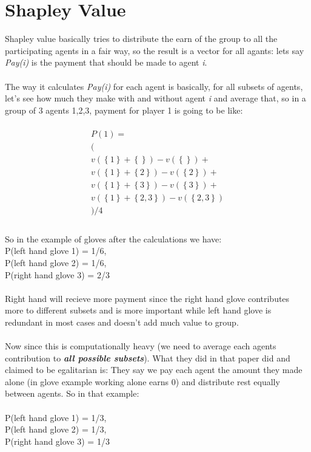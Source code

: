 \documentclass{article}
\begin{document}
  
\section{Shapley Value}
  
Shapley value basically tries to distribute the earn of the group to all the participating agents in a fair way, so the result is a vector for all agants: lets say \emph{Pay(i)} is the payment that should be made to agent \emph{i}.
\\
\\
The way it calculates \emph{Pay(i)} for each agent is basically, for all subsets of agents, let's see how much they make with and without agent \emph{i} and average that, so in a group of 3 agents {1,2,3}, payment for player 1 is going to be like:
\\
\\
\begin{gather*}
P(1) = 
\\
 (
\\
v(\left\{1\right\} + \left\{\right\}) - v(\left\{\right\}) +
\\
v(\left\{1\right\} + \left\{2\right\}) - v(\left\{2\right\}) + 
\\
v(\left\{1\right\} + \left\{3\right\}) - v(\left\{3\right\}) +
\\
v(\left\{1\right\} + \left\{2,3\right\}) - v(\left\{2,3\right\})  
\\
) / 4
\\
\end{gather*}
\\
So in the example of gloves after the calculations we have: \\
P(left hand glove 1) = 1/6, \\
P(left hand glove 2) = 1/6, \\
P(right hand glove 3)  = 2/3 \\
\\
Right hand will recieve more payment since the right hand glove contributes more to different subsets and is more important while left hand glove is redundant in most cases and doesn't add much value to group.
\\
\\
Now since this is computationally heavy (we need to average each agents contribution to \emph{\textbf{all possible subsets}}). What they did in that paper did and claimed to be egalitarian is: 
They say we pay each agent the amount they made alone (in glove example working alone earns 0) and distribute rest equally between agents. So in that example:
\\
\\
P(left hand glove 1) = 1/3, \\
P(left hand glove 2) = 1/3, \\
P(right hand glove 3)  = 1/3 \\
\end{document}
